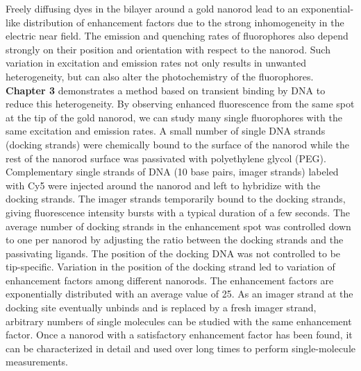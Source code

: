 Freely diffusing dyes in the bilayer around a gold nanorod lead to an exponential-like distribution of enhancement factors due to the strong inhomogeneity in the electric near field.
The emission and quenching rates of fluorophores also depend strongly on their position and orientation with respect to the nanorod.
Such variation in excitation and emission rates not only results in unwanted heterogeneity, but can also alter the photochemistry of the fluorophores.
\textbf{Chapter 3} demonstrates a method based on transient binding by DNA to reduce this heterogeneity.
By observing enhanced fluorescence from the same spot at the tip of the gold nanorod, we can study many single fluorophores with the same excitation and emission rates.
A small number of single DNA strands (docking strands) were chemically bound to the surface of the nanorod while the rest of the nanorod surface was passivated with polyethylene glycol (PEG).
Complementary single strands of DNA (10 base pairs, imager strands) labeled with Cy5 were injected around the nanorod and left to hybridize with the docking strands.
The imager strands temporarily bound to the docking strands, giving fluorescence intensity bursts with a typical duration of a few seconds.
The average number of docking strands in the enhancement spot was controlled down to one per nanorod by adjusting the ratio between the docking strands and the passivating ligands.
The position of the docking DNA was not controlled to be tip-specific.
Variation in the position of the docking strand led to variation of enhancement factors among different nanorods.
The enhancement factors are exponentially distributed with an average value of 25.
As an imager strand at the docking site eventually unbinds and is replaced by a fresh imager strand, arbitrary numbers of single molecules can be studied with the same enhancement factor.
Once a nanorod with a satisfactory enhancement factor has been found, it can be characterized in detail and used over long times to perform single-molecule measurements.


